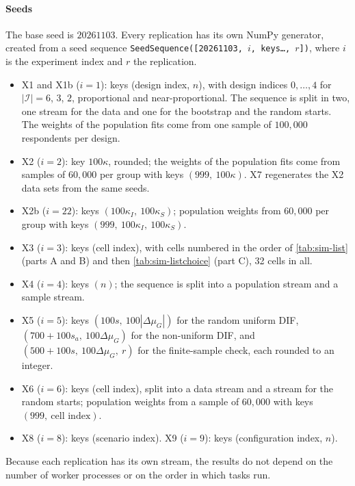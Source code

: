 \paragraph{Seeds}
The base seed is $20261103$. Every replication has its own NumPy generator, created from a seed sequence \texttt{SeedSequence([20261103,\,$i$,\,keys\dots,\,$r$])}, where $i$ is the experiment index and $r$ the replication.
\begin{itemize}
  \item X1 and X1b ($i=1$): keys (design index, $n$), with design indices $0,\dots,4$ for $|\mathcal I|=6$, $3$, $2$, proportional and near-proportional. The sequence is split in two, one stream for the data and one for the bootstrap and the random starts. The weights of the population fits come from one sample of $100{,}000$ respondents per design.
  \item X2 ($i=2$): key $100\kappa$, rounded; the weights of the population fits come from samples of $60{,}000$ per group with keys $(999,\ 100\kappa)$. X7 regenerates the X2 data sets from the same seeds.
  \item X2b ($i=22$): keys $(100\kappa_I,\ 100\kappa_S)$; population weights from $60{,}000$ per group with keys $(999,\ 100\kappa_I,\ 100\kappa_S)$.
  \item X3 ($i=3$): keys (cell index), with cells numbered in the order of \cref{tab:sim-list} (parts A and B) and then \cref{tab:sim-listchoice} (part C), 32 cells in all.
  \item X4 ($i=4$): keys $(n)$; the sequence is split into a population stream and a sample stream.
  \item X5 ($i=5$): keys $(100s,\ 100|\Delta\mu_G|)$ for the random uniform DIF, $(700+100s_a,\ 100\Delta\mu_G)$ for the non-uniform DIF, and $(500+100s,\ 100\Delta\mu_G,\ r)$ for the finite-sample check, each rounded to an integer.
  \item X6 ($i=6$): keys (cell index), split into a data stream and a stream for the random starts; population weights from a sample of $60{,}000$ with keys $(999,\ \text{cell index})$.
  \item X8 ($i=8$): keys (scenario index). X9 ($i=9$): keys (configuration index, $n$).
\end{itemize}
Because each replication has its own stream, the results do not depend on the number of worker processes or on the order in which tasks run.

